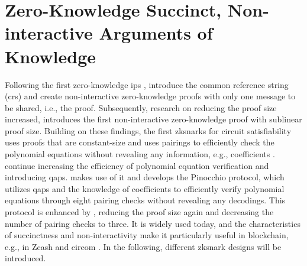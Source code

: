 \section{Zero-Knowledge Succinct, Non-interactive Arguments of Knowledge}
Following the first zero-knowledge \acrshort{ip}s \citep{GoldwasserIPs}, \citet{Blum1991} introduce the common reference string (\acrshort{crs}) and create non-interactive zero-knowledge proofs with only one message to be shared, i.e., the proof. Subsequently, research on reducing the proof size increased, \citet{MicaliArgSys} introduces the first non-interactive zero-knowledge proof with sublinear proof size. Building on these findings, the first \acrshort{zksnark}s for circuit satisfiability uses proofs that are constant-size and uses pairings to efficiently check the polynomial equations without revealing any information, e.g., coefficients \citep{Groth2010ShortPN}. \citet{GennaroLinPCP} continue increasing the efficiency of polynomial equation verification and introducing \acrshort{qap}s. \citet{Pinocchio} makes use of it and develops the Pinocchio protocol, which utilizes \acrshort{qap}s and the knowledge of coefficients to efficiently verify polynomial equations through eight pairing checks without revealing any decodings. This protocol is enhanced by \citet{Groth2016OnTS}, reducing the proof size again and decreasing the number of pairing checks to three. It is widely used today, and the characteristics of succinctness and non-interactivity make it particularly useful in blockchain, e.g., in Zcash and circom \citep{chen2022review}. In the following, different \acrshort{zksnark} designs will be introduced.


